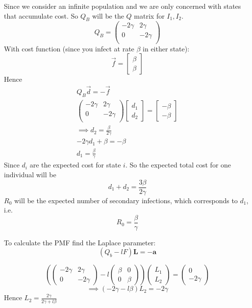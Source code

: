 \documentclass{/home/janmebows/Documents/LatexTemplates/myassignment}
\begin{document}
\begin{enumerate}
\begin{enumerate}[label=(\roman*)]
				Since we consider an infinite population and we are only concerned with states that accumulate cost. So $Q_B$ will be the $Q$ matrix for $I_1,I_2$.
				\[Q_B = \begin{pmatrix}
					-2 \gamma& 2 \gamma\\
					0 & -2 \gamma\\
				\end{pmatrix}\]
				With cost function (since you infect at rate $\beta$ in either state):
				\[\vec f = \begin{bmatrix}
					\beta\\ \beta
				\end{bmatrix}\]
				Hence
				\begin{align*}
					Q_B \vec d = -\vec f\\
					\begin{pmatrix}
					-2 \gamma& 2 \gamma\\
					0 & -2 \gamma\\
					\end{pmatrix} \begin{bmatrix}
						d_1\\d_2
					\end{bmatrix} = \begin{bmatrix}
					-\beta\\ -\beta
				\end{bmatrix}\\
				\implies d_2 = \frac{\beta}{2\gamma}\\
				-2 \gamma d_1 +\beta = -\beta\\
				d_1 = \frac{\beta}{\gamma}
				\end{align*}
				Since $d_i$ are the expected cost for state $i$. So the expected total cost for one individual will be
				\[d_1 + d_2 = \frac{3 \beta}{2 \gamma}\]
				$R_0$ will be the expected number of secondary infections, which corresponds to $d_1$, i.e.
				\[R_0 = \frac{\beta}{\gamma}\]

				To calculate the PMF find the Laplace parameter:
				\[(Q_b - lF)\mathbf{L} = -\mathbf{a}\]

				\[\left(\begin{pmatrix}
					-2 \gamma& 2 \gamma\\
					0 & -2 \gamma
				\end{pmatrix} - l \begin{pmatrix}
					\beta&0\\0&\beta
				\end{pmatrix}\right)\begin{pmatrix}
					L_1\\L_2
				\end{pmatrix} = \begin{pmatrix}
					0\\
					-2\gamma
				\end{pmatrix} \]
				\[\implies (-2\gamma - l\beta)L_2 = -2\gamma\]
				Hence $L_2 = \frac{2\gamma}{2\gamma + l\beta}$


\end{enumerate}
\end{enumerate}
\end{document}
